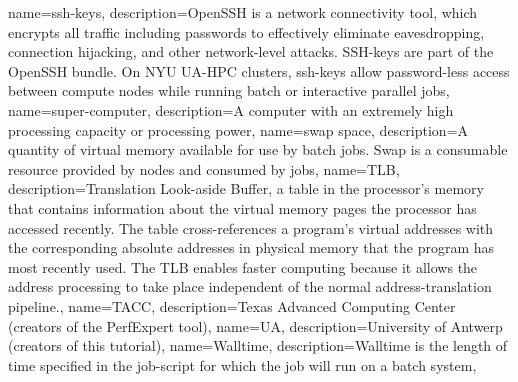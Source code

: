 {
  name={ssh-keys},
  description={OpenSSH is a network connectivity tool, which encrypts all traffic including passwords to effectively eliminate eavesdropping, connection hijacking, and other network-level attacks. SSH-keys are part of the OpenSSH bundle. On NYU UA-HPC clusters, ssh-keys allow password-less access between compute nodes while running batch or interactive parallel jobs},
}
{
  name={super-computer},
  description={A computer with an extremely high processing capacity or processing power},
}
{
  name={swap space},
  description={A quantity of virtual memory available for use by batch jobs. Swap is a consumable resource provided by nodes and consumed by jobs},
}
{
  name={TLB},
  description={Translation Look-aside Buffer, a table in the processor's memory that contains information about the virtual memory pages the processor has accessed recently. The table cross-references a program's virtual addresses with the corresponding absolute addresses in physical memory that the program has most recently used. The TLB enables faster computing because it allows the address processing to take place independent of the normal address-translation pipeline.},
}
{
  name={TACC},
  description={Texas Advanced Computing Center (creators of the PerfExpert tool)},
}
{
  name={UA},
  description={University of Antwerp (creators of this tutorial)},
}
{
  name={Walltime},
  description={Walltime is the length of time specified in the job-script for which the job will run on a batch system},
}
